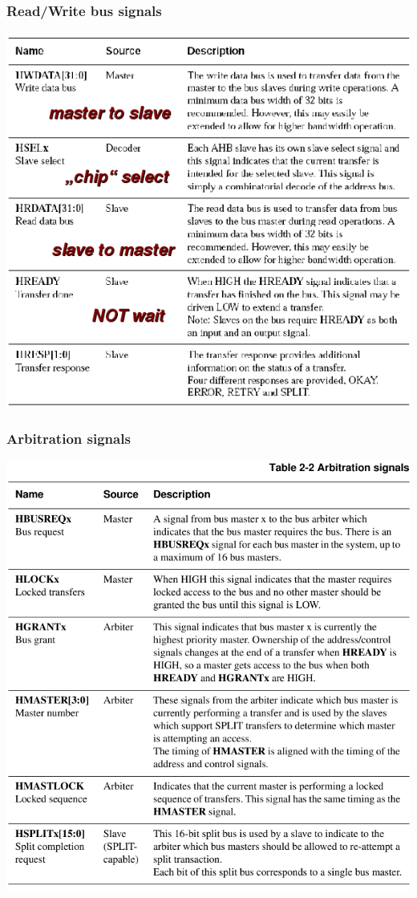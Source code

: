 \documentclass[a4paper]{scrartcl}
\begin{document}
        \subsubsection*{Read/Write bus signals}
        \centering\includegraphics[scale=0.6]{amba2}
        \subsubsection*{Arbitration signals}
        \centering\includegraphics[scale=0.6]{amba3}
\end{document}
